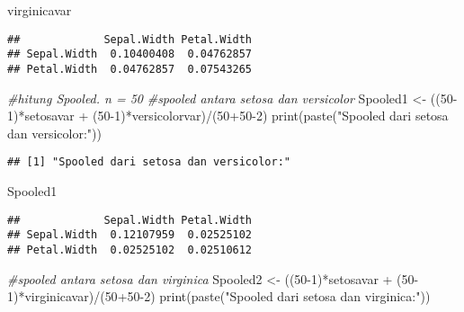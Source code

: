 \documentclass[
]{article}
\newenvironment{Shaded}{\begin{snugshade}}{\end{snugshade}}
\newcommand{\CommentTok}[1]{\textcolor[rgb]{0.56,0.35,0.01}{\textit{#1}}}
\newcommand{\DecValTok}[1]{\textcolor[rgb]{0.00,0.00,0.81}{#1}}
\newcommand{\FunctionTok}[1]{\textcolor[rgb]{0.00,0.00,0.00}{#1}}
\newcommand{\NormalTok}[1]{#1}
\newcommand{\OtherTok}[1]{\textcolor[rgb]{0.56,0.35,0.01}{#1}}
\newcommand{\SpecialCharTok}[1]{\textcolor[rgb]{0.00,0.00,0.00}{#1}}
\newcommand{\StringTok}[1]{\textcolor[rgb]{0.31,0.60,0.02}{#1}}
\begin{document}
\begin{Shaded}
\begin{Highlighting}[]
\NormalTok{virginicavar}
\end{Highlighting}
\end{Shaded}

\begin{verbatim}
##             Sepal.Width Petal.Width
## Sepal.Width  0.10400408  0.04762857
## Petal.Width  0.04762857  0.07543265
\end{verbatim}

\begin{Shaded}
\begin{Highlighting}[]
\CommentTok{\#hitung Spooled. n = 50}
\CommentTok{\#spooled antara setosa dan versicolor}
\NormalTok{Spooled1 }\OtherTok{\textless{}{-}}\NormalTok{ ((}\DecValTok{50{-}1}\NormalTok{)}\SpecialCharTok{*}\NormalTok{setosavar }\SpecialCharTok{+}\NormalTok{ (}\DecValTok{50{-}1}\NormalTok{)}\SpecialCharTok{*}\NormalTok{versicolorvar)}\SpecialCharTok{/}\NormalTok{(}\DecValTok{50}\SpecialCharTok{+}\DecValTok{50{-}2}\NormalTok{)}
\FunctionTok{print}\NormalTok{(}\FunctionTok{paste}\NormalTok{(}\StringTok{"Spooled dari setosa dan versicolor:"}\NormalTok{))}
\end{Highlighting}
\end{Shaded}

\begin{verbatim}
## [1] "Spooled dari setosa dan versicolor:"
\end{verbatim}

\begin{Shaded}
\begin{Highlighting}[]
\NormalTok{Spooled1}
\end{Highlighting}
\end{Shaded}

\begin{verbatim}
##             Sepal.Width Petal.Width
## Sepal.Width  0.12107959  0.02525102
## Petal.Width  0.02525102  0.02510612
\end{verbatim}

\begin{Shaded}
\begin{Highlighting}[]
\CommentTok{\#spooled antara setosa dan virginica}
\NormalTok{Spooled2 }\OtherTok{\textless{}{-}}\NormalTok{ ((}\DecValTok{50{-}1}\NormalTok{)}\SpecialCharTok{*}\NormalTok{setosavar }\SpecialCharTok{+}\NormalTok{ (}\DecValTok{50{-}1}\NormalTok{)}\SpecialCharTok{*}\NormalTok{virginicavar)}\SpecialCharTok{/}\NormalTok{(}\DecValTok{50}\SpecialCharTok{+}\DecValTok{50{-}2}\NormalTok{)}
\FunctionTok{print}\NormalTok{(}\FunctionTok{paste}\NormalTok{(}\StringTok{"Spooled dari setosa dan virginica:"}\NormalTok{))}
\end{Highlighting}
\end{Shaded}
\end{document}
